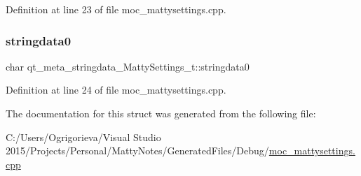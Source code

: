 Definition at line 23 of file moc\+\_\+mattysettings.\+cpp.

\hypertarget{structqt__meta__stringdata__MattySettings__t_a266b7703ec9f21f50b222ad586c210e3}{}\label{structqt__meta__stringdata__MattySettings__t_a266b7703ec9f21f50b222ad586c210e3} 
\subsubsection{\texorpdfstring{stringdata0}{stringdata0}}
{\footnotesize\ttfamily char qt\+\_\+meta\+\_\+stringdata\+\_\+\+Matty\+Settings\+\_\+t\+::stringdata0}



Definition at line 24 of file moc\+\_\+mattysettings.\+cpp.



The documentation for this struct was generated from the following file\+:\begin{DoxyCompactItemize}
\item 
C\+:/\+Users/\+Ogrigorieva/\+Visual Studio 2015/\+Projects/\+Personal/\+Matty\+Notes/\+Generated\+Files/\+Debug/\hyperlink{Debug_2moc__mattysettings_8cpp}{moc\+\_\+mattysettings.\+cpp}\end{DoxyCompactItemize}
